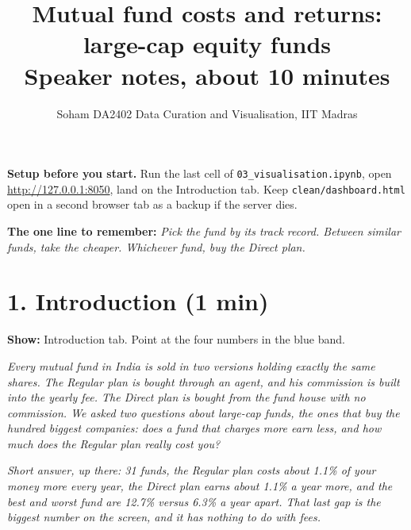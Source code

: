 \documentclass[11pt,a4paper]{article}
\title{Mutual fund costs and returns: large-cap equity funds\\[4pt]\large Speaker notes, about 10 minutes}
\author{Soham \quad DA2402 Data Curation and Visualisation, IIT Madras}
\date{}
\newcommand{\say}[1]{\par\medskip\noindent\textcolor{black!70}{\textit{#1}}\par\medskip}
\newcommand{\onscreen}[1]{\noindent\textbf{Show:} #1\par}
\begin{document}
\maketitle

\noindent\textbf{Setup before you start.} Run the last cell of \texttt{03\_visualisation.ipynb}, open \url{http://127.0.0.1:8050}, land on the Introduction tab. Keep \texttt{clean/dashboard.html} open in a second browser tab as a backup if the server dies.

\medskip
\noindent\textbf{The one line to remember:} \emph{Pick the fund by its track record. Between similar funds, take the cheaper. Whichever fund, buy the Direct plan.}

\section*{1. Introduction (1 min)}
\onscreen{Introduction tab. Point at the four numbers in the blue band.}
\say{Every mutual fund in India is sold in two versions holding exactly the same shares. The Regular plan is bought through an agent, and his commission is built into the yearly fee. The Direct plan is bought from the fund house with no commission. We asked two questions about large-cap funds, the ones that buy the hundred biggest companies: does a fund that charges more earn less, and how much does the Regular plan really cost you?}
\say{Short answer, up there: 31 funds, the Regular plan costs about 1.1\% of your money more every year, the Direct plan earns about 1.1\% a year more, and the best and worst fund are 12.7\% versus 6.3\% a year apart. That last gap is the biggest number on the screen, and it has nothing to do with fees.}
\end{document}
